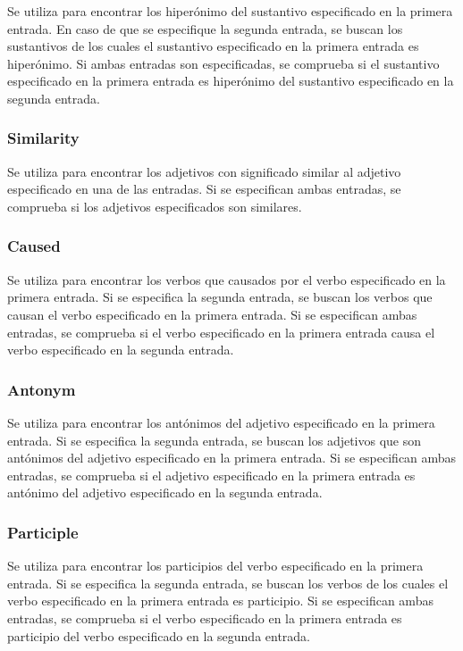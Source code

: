 \documentclass[12pt]{article}
\begin{document}
Se utiliza para encontrar los hiperónimo del sustantivo especificado en la primera entrada. En caso de que se especifique la segunda entrada, se buscan los sustantivos de los cuales el sustantivo especificado en la primera entrada es hiperónimo. Si ambas entradas son especificadas, se comprueba si el sustantivo especificado en la primera entrada es hiperónimo del sustantivo especificado en la segunda entrada.

\subsubsection{Similarity}

Se utiliza para encontrar los adjetivos con significado similar al adjetivo especificado en una de las entradas. Si se especifican ambas entradas, se comprueba si los adjetivos especificados son similares.

\subsubsection{Caused}

Se utiliza para encontrar los verbos que causados por el verbo especificado en la primera entrada. Si se especifica la segunda entrada, se buscan los verbos que causan el verbo especificado en la primera entrada. Si se especifican ambas entradas, se comprueba si el verbo especificado en la primera entrada causa el verbo especificado en la segunda entrada.

\subsubsection{Antonym}

Se utiliza para encontrar los antónimos del adjetivo especificado en la primera entrada. Si se especifica la segunda entrada, se buscan los adjetivos que son antónimos del adjetivo especificado en la primera entrada. Si se especifican ambas entradas, se comprueba si el adjetivo especificado en la primera entrada es antónimo del adjetivo especificado en la segunda entrada.

\subsubsection{Participle}

Se utiliza para encontrar los participios del verbo especificado en la primera entrada. Si se especifica la segunda entrada, se buscan los verbos de los cuales el verbo especificado en la primera entrada es participio. Si se especifican ambas entradas, se comprueba si el verbo especificado en la primera entrada es participio del verbo especificado en la segunda entrada.
\end{document}
